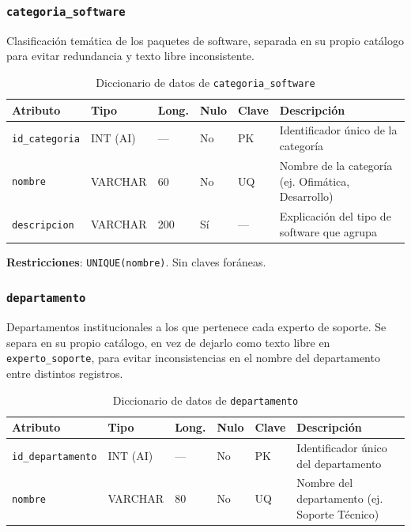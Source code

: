 \documentclass[10pt,a4paper]{article}
\begin{document}
\subsubsection{\texttt{categoria\_software}}

Clasificación temática de los paquetes de software, separada en su propio catálogo para evitar redundancia y texto libre inconsistente.

\begin{table}[H]
	\centering
	\footnotesize
	\begin{tabular}{p{2.9cm} | p{1.6cm} | p{0.8cm} | p{0.7cm} | p{1cm} | p{7.2cm}}\hline \hline
		\textbf{Atributo} & \textbf{Tipo} & \textbf{Long.} & \textbf{Nulo} & \textbf{Clave} & \textbf{Descripción} \\ \hline \hline
		\texttt{id\_categoria} & INT (AI) & --- & No & PK & Identificador único de la categoría \\ \hline
		\texttt{nombre} & VARCHAR & 60 & No & UQ & Nombre de la categoría (ej. Ofimática, Desarrollo) \\ \hline
		\texttt{descripcion} & VARCHAR & 200 & Sí & --- & Explicación del tipo de software que agrupa \\ \hline \hline
	\end{tabular}
	\caption{Diccionario de datos de \texttt{categoria\_software}}
	\label{tabla:dic-categoria}
\end{table}

\textbf{Restricciones}: \texttt{UNIQUE(nombre)}. Sin claves foráneas.

\subsubsection{\texttt{departamento}}

Departamentos institucionales a los que pertenece cada experto de soporte. Se separa en su propio catálogo, en vez de dejarlo como texto libre en \texttt{experto\_soporte}, para evitar inconsistencias en el nombre del departamento entre distintos registros.

\begin{table}[H]
	\centering
	\footnotesize
	\begin{tabular}{p{2.9cm} | p{1.6cm} | p{0.8cm} | p{0.7cm} | p{1cm} | p{7.2cm}}\hline \hline
		\textbf{Atributo} & \textbf{Tipo} & \textbf{Long.} & \textbf{Nulo} & \textbf{Clave} & \textbf{Descripción} \\ \hline \hline
		\texttt{id\_departamento} & INT (AI) & --- & No & PK & Identificador único del departamento \\ \hline
		\texttt{nombre} & VARCHAR & 80 & No & UQ & Nombre del departamento (ej. Soporte Técnico) \\ \hline \hline
	\end{tabular}
	\caption{Diccionario de datos de \texttt{departamento}}
	\label{tabla:dic-departamento}
\end{table}
\end{document}

